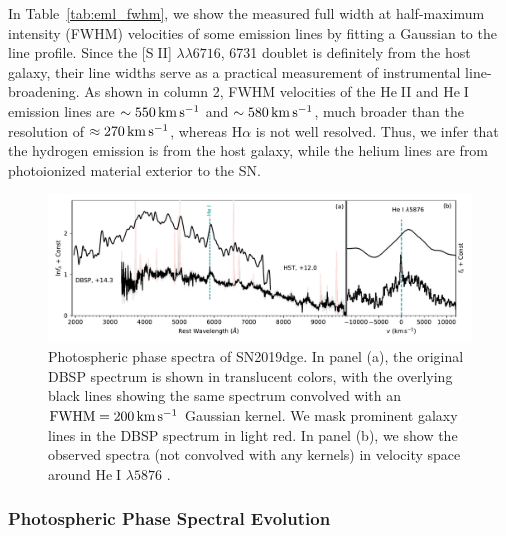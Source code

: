 \documentclass[twocolumn]{aastex63}
\newcommand{\name}{SN2019dge}
\def\ion#1#2{#1$\;${\footnotesize\rm{#2}}\relax}
\begin{document}
\begin{CJK*}{UTF8}{gbsn}
In Table~\ref{tab:eml_fwhm}, we show the measured full width at 
half-maximum intensity (FWHM) velocities of some emission lines by fitting a 
Gaussian to the line profile. Since the [\ion{S}{II}] $\lambda\lambda 6716$, 6731 doublet is definitely 
from the host galaxy, their line widths serve as a practical measurement of instrumental 
line-broadening. As shown in column 2, FWHM velocities of the \ion{He}{II} and \ion{He}{I} emission 
lines are $\sim 550\,{\rm km\,s^{-1}}$ and $\sim 580\,{\rm km\,s^{-1}}$, much broader than the 
resolution of $\approx 270\,{\rm km\,s^{-1}}$, whereas H$\alpha$ is not well resolved. Thus, we infer 
that the hydrogen emission is from the host galaxy, while the helium lines are from photoionized 
material exterior to the SN.

\begin{figure}[htbp!]
	\centering
	\includegraphics[width=\textwidth]{figures/spectra_phot.pdf}
	\caption{Photospheric phase spectra of \name. In panel (a), the original DBSP 
		spectrum is shown in translucent colors, with the overlying black lines showing the same 
		spectrum 
		convolved with an ${\rm FWHM} = 200\, {\rm km\, s^{-1}}$ Gaussian kernel. We mask prominent 
		galaxy lines in the DBSP spectrum in light red. In panel (b), we show the observed spectra (not 
		convolved with any kernels) in velocity space around \ion{He}{I} $\lambda 5876$ .
		\label{fig:spectra}}
\end{figure}

\subsubsection{Photospheric Phase Spectral Evolution}  \label{subsubsec:spec_middle}


\end{CJK*}
\end{document}

